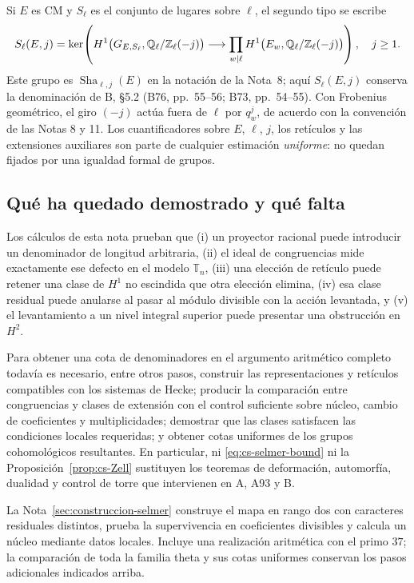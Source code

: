 Si $E$ es CM y $S_\ell$ es el conjunto de lugares sobre
$\ell$, el segundo tipo se escribe
\begin{equation}
 S_\ell(E,j)=\ker\!\left(
 H^1\bigl(G_{E,S_\ell},\mathbb{Q}_\ell/\mathbb{Z}_\ell(-j)\bigr)
 \longrightarrow
 \prod_{w\mid\ell}
 H^1\bigl(E_w,\mathbb{Q}_\ell/\mathbb{Z}_\ell(-j)\bigr)
 \right),\quad j\ge1.
 \label{eq:cs-Sell}
\end{equation}
Este grupo es $\operatorname{Sha}_{\ell,j}(E)$ en la
notación de la Nota~8; aquí $S_\ell(E,j)$ conserva la
denominación de B, §5.2 (B76, pp.~55--56; B73, pp.~54--55).
Con Frobenius geométrico, el giro $(-j)$ actúa
fuera de $\ell$ por $q_w^j$, de acuerdo con
la convención de las Notas 8 y 11.
Los cuantificadores sobre $E$, $\ell$, $j$, los retículos
y las extensiones auxiliares son parte de cualquier
estimación \emph{uniforme}: no quedan fijados por
una igualdad formal de grupos.

\subsection{Qué ha quedado demostrado y qué falta}

Los cálculos de esta nota prueban que (i) un proyector
racional puede introducir un denominador de longitud
arbitraria, (ii) el ideal de congruencias mide exactamente
ese defecto en el modelo $\mathbb T_n$, (iii) una elección
de retículo puede retener una clase de $H^1$ no escindida
que otra elección elimina, (iv) esa clase residual puede
anularse al pasar al módulo divisible con la acción levantada,
y (v) el levantamiento a un nivel integral superior puede
presentar una obstrucción en $H^2$.

Para obtener una cota de denominadores en el argumento
aritmético completo todavía es necesario, entre otros pasos,
construir las representaciones y retículos compatibles
con los sistemas de Hecke; producir la comparación entre
congruencias y clases de extensión con el control suficiente
sobre núcleo, cambio de coeficientes y multiplicidades;
demostrar que las clases
satisfacen las condiciones locales requeridas; y obtener
cotas uniformes de los grupos cohomológicos resultantes.
En particular, ni \eqref{eq:cs-selmer-bound} ni la
Proposición~\ref{prop:cs-Zell} sustituyen los teoremas de
deformación, automorfía, dualidad y control de torre
que intervienen en A, A93 y B.

La Nota~\ref{sec:construccion-selmer} construye el mapa en rango
dos con caracteres residuales distintos, prueba la supervivencia
en coeficientes divisibles y calcula un núcleo mediante datos
locales. Incluye una realización aritmética con el primo $37$;
la comparación de toda la familia theta y sus cotas uniformes
conservan los pasos adicionales indicados arriba.

